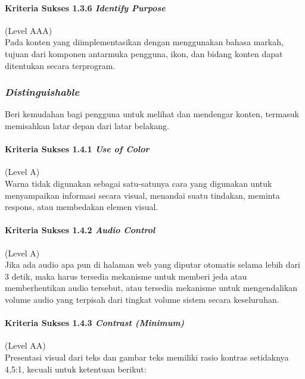 \paragraph{Kriteria Sukses 1.3.6 \textit{Identify Purpose}}
\label{sec:kriteria_sukses_1.3.6}
(Level AAA)\\

Pada konten yang diimplementasikan dengan menggunakan bahasa markah, tujuan dari komponen antarmuka pengguna, ikon, dan bidang konten dapat ditentukan secara terprogram.

\subsubsection{\textit{Distinguishable}}
\label{sec:distinguishable}
Beri kemudahan bagi pengguna untuk melihat dan mendengar konten, termasuk memisahkan latar depan dari latar belakang.

\paragraph{Kriteria Sukses 1.4.1 \textit{Use of Color}}
\label{sec:kriteria_sukses_1.4.1}
(Level A)\\

Warna tidak digunakan sebagai satu-satunya cara yang digunakan untuk menyampaikan informasi secara visual, menandai suatu tindakan, meminta respons, atau membedakan elemen visual.

\paragraph{Kriteria Sukses 1.4.2 \textit{Audio Control}}
\label{sec:kriteria_sukses_1.4.2}
(Level A)\\

Jika ada audio apa pun di halaman web yang diputar otomatis selama lebih dari 3 detik, maka harus tersedia mekanisme untuk memberi jeda atau memberhentikan audio tersebut, atau tersedia mekanisme untuk mengendalikan volume audio yang terpisah dari tingkat volume sistem secara keseluruhan.

\paragraph{Kriteria Sukses 1.4.3 \textit{Contrast (Minimum)}}
\label{sec:kriteria_sukses_1.4.3}
(Level AA)\\

Presentasi visual dari teks dan gambar teks memiliki rasio kontras setidaknya 4,5:1, kecuali untuk ketentuan berikut:

